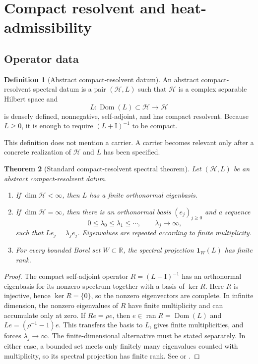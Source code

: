 \documentclass[11pt,a4paper]{article}
\newtheorem{theorem}{Theorem}[section]
\theoremstyle{definition}
\newtheorem{definition}[theorem]{Definition}
\theoremstyle{remark}
\newcommand{\R}{\mathbb R}
\newcommand{\Hcal}{\mathcal H}
\newcommand{\Dom}{\operatorname{Dom}}
\newcommand{\ran}{\operatorname{ran}}
\newcommand{\Id}{\mathrm I}
\begin{document}
\section{Compact resolvent and heat-admissibility}

\subsection{Operator data}

\begin{definition}[Abstract compact-resolvent datum]
An abstract compact-resolvent spectral datum is a pair \((\Hcal,L)\) such that
\(\Hcal\) is a complex separable Hilbert space and
\[
 L:\Dom(L)\subset\Hcal\longrightarrow\Hcal
\]
is densely defined, nonnegative, self-adjoint, and has compact resolvent.
Because \(L\geq0\), it is enough to require \((L+\Id)^{-1}\) to be compact.
\end{definition}

This definition does not mention a carrier. A carrier becomes relevant only
after a concrete realization of \(\Hcal\) and \(L\) has been specified.

\begin{theorem}[Standard compact-resolvent spectral theorem]
\label{thm:compact-resolvent}
Let \((\Hcal,L)\) be an abstract compact-resolvent datum.
\begin{enumerate}
\item If \(\dim\Hcal<\infty\), then \(L\) has a finite orthonormal eigenbasis.
\item If \(\dim\Hcal=\infty\), then there is an orthonormal basis
      \((e_j)_{j\geq0}\) and a sequence
      \[
        0\leq\lambda_0\leq\lambda_1\leq\cdots,\qquad
        \lambda_j\longrightarrow\infty,
      \]
      such that \(Le_j=\lambda_je_j\). Eigenvalues are repeated according to
      finite multiplicity.
\item For every bounded Borel set \(W\subset\R\), the spectral projection
      \(\mathbf 1_W(L)\) has finite rank.
\end{enumerate}
\end{theorem}

\begin{proof}
The compact self-adjoint operator \(R=(L+\Id)^{-1}\) has an orthonormal
eigenbasis for its nonzero spectrum together with a basis of \(\ker R\).
Here \(R\) is injective, hence \(\ker R=\{0\}\), so the nonzero eigenvectors
are complete. In infinite dimension, the nonzero eigenvalues of \(R\) have
finite multiplicity and can accumulate only at zero. If \(Re=\rho e\), then
\(e\in\ran R=\Dom(L)\) and \(Le=(\rho^{-1}-1)e\). This transfers the basis to
\(L\), gives finite multiplicities, and forces \(\lambda_j\to\infty\).
The finite-dimensional alternative must be stated separately. In either case,
a bounded set meets only finitely many eigenvalues counted with multiplicity,
so its spectral projection has finite rank. See
\cite[Chs.~VI--VII]{ReedSimonI} or \cite[Ch.~III]{Kato}.
\end{proof}
\end{document}
